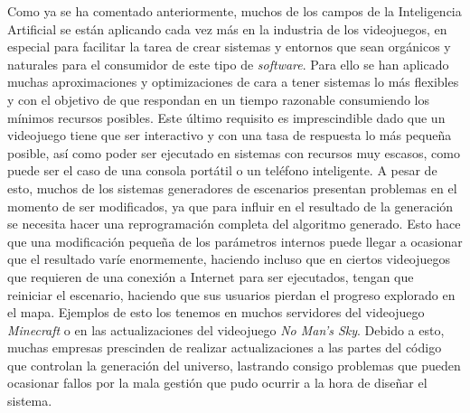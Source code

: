 Como ya se ha comentado anteriormente, muchos de los campos de la Inteligencia Artificial se están aplicando cada vez más en la industria de los videojuegos, en especial para facilitar la tarea de crear sistemas y entornos que sean orgánicos y naturales para el consumidor de este tipo de \textit{software}. Para ello se han aplicado muchas aproximaciones y optimizaciones de cara a tener sistemas lo más flexibles y con el objetivo de que respondan en un tiempo razonable consumiendo los mínimos recursos posibles. Este último requisito es imprescindible dado que un videojuego tiene que ser interactivo y con una tasa de respuesta lo más pequeña posible, así como poder ser ejecutado en sistemas con recursos muy escasos, como puede ser el caso de una consola portátil o un teléfono inteligente. A pesar de esto, muchos de los sistemas generadores de escenarios presentan problemas en el momento de ser modificados, ya que para influir en el resultado de la generación se necesita hacer una reprogramación completa del algoritmo generado. Esto hace que una modificación pequeña de los parámetros internos puede llegar a ocasionar que el resultado varíe enormemente, haciendo incluso que en ciertos videojuegos que requieren de una conexión a Internet para ser ejecutados, tengan que reiniciar el escenario, haciendo que sus usuarios pierdan el progreso explorado en el mapa. Ejemplos de esto los tenemos en muchos servidores del videojuego \textit{Minecraft} o en las actualizaciones del videojuego \textit{No Man's Sky}. Debido a esto, muchas empresas prescinden de realizar actualizaciones a las partes del código que controlan la generación del universo, lastrando consigo problemas que pueden ocasionar fallos por la mala gestión que pudo ocurrir a la hora de diseñar el sistema. \\

